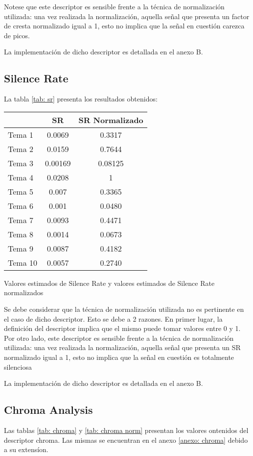 \documentclass[]{article}
\makeatletter
\newcommand{\tabla}[4]{
\begin{tablehere}
\begin{center}
\begin{tabular}{#1}
#2
\end{tabular}
\caption{#3}
\label{#4}
\end{center}
\end{tablehere}
}
\newenvironment{tablehere}    %
  {\def\@captype{table}}    %

  {}              %
\makeatother
\begin{document}
\begin{multicols}{2}
Notese que este descriptor es sensible frente a la técnica de normalización
utilizada: una vez realizada la normalización, aquella señal que presenta un factor de cresta
normalizado igual a 1, esto no implica que la señal en cuestión carezca de picos.

La implementación de dicho descriptor es detallada en el anexo B.

\subsection{Silence Rate}
\label{sub: Silence rate}
La tabla \ref{tab: sr} presenta los resultados obtenidos:
\vspace{0.3 cm}
\tabla
{|l|c|c|}
{
\hline
& SR	& SR Normalizado \\
\hline
Tema 1 &	0.0069 &	0.3317 \\
\hline
Tema 2	& 0.0159	& 0.7644 \\
\hline
Tema 3 &	0.00169 &	0.08125 \\
\hline
Tema 4 &	 0.0208	&  1 \\
\hline
Tema 5	&  0.007  &	0.3365 \\
\hline
Tema 6  &	0.001	 & 0.0480 \\
\hline
Tema 7	&  0.0093	 & 0.4471 \\
\hline
Tema 8  &	0.0014  &	0.0673 \\
\hline
Tema 9	&  0.0087 &	0.4182 \\
\hline
Tema 10	&  0.0057 &	0.2740 \\
\hline
}
{Valores estimados de Silence Rate y valores estimados de Silence Rate normalizados}
{tab: sr}

Se debe considerar que la técnica de normalización utilizada no es
pertinente en el caso de dicho descriptor. Esto se debe a 2 razones. En primer
lugar, la definición del descriptor implica que el mismo puede tomar valores entre
0 y 1. Por otro lado, este descriptor es sensible frente a la técnica de normalización
utilizada: una vez realizada la normalización, aquella señal que presenta un SR
normalizado igual a 1, esto no implica que la señal en cuestión es totalmente silenciosa

La implementación de dicho descriptor es detallada en el anexo B.

\subsection{Chroma Analysis}
Las tablas \ref{tab: chroma} y \ref{tab: chroma norm} presentan los valores
ontenidos del descriptor chroma.
Las mismas se encuentran en el anexo \ref{anexo: chroma} debido a su
extensíon.


\end{multicols}
\end{document}
